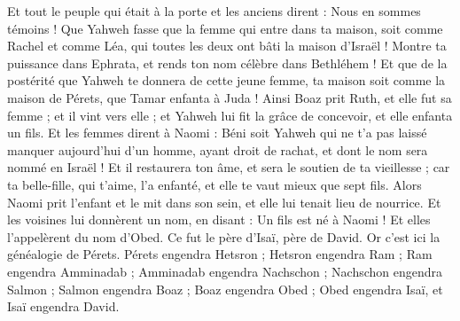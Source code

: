 \begin{multicols}{2}
Et tout le peuple qui était à la porte et les anciens dirent : Nous en sommes témoins ! Que Yahweh fasse que la femme qui entre dans ta maison, soit comme Rachel et comme Léa, qui toutes les deux ont bâti la maison d'Israël ! Montre ta puissance dans Ephrata, et rends ton nom célèbre dans Bethléhem !
Et que de la postérité que Yahweh te donnera de cette jeune femme, ta maison soit comme la maison de Pérets, que Tamar enfanta à Juda !
Ainsi Boaz prit Ruth, et elle fut sa femme ; et il vint vers elle ; et Yahweh lui fit la grâce de concevoir, et elle enfanta un fils.
Et les femmes dirent à Naomi : Béni soit Yahweh qui ne t'a pas laissé manquer aujourd'hui d'un homme, ayant droit de rachat, et dont le nom sera nommé en Israël !
Et il restaurera ton âme, et sera le soutien de ta vieillesse ; car ta belle-fille, qui t'aime, l'a enfanté, et elle te vaut mieux que sept fils.
Alors Naomi prit l'enfant et le mit dans son sein, et elle lui tenait lieu de nourrice.
Et les voisines lui donnèrent un nom, en disant : Un fils est né à Naomi ! Et elles l'appelèrent du nom d'Obed. Ce fut le père d'Isaï, père de David.
Or c'est ici la généalogie de Pérets. Pérets engendra Hetsron ;
Hetsron engendra Ram ; Ram engendra Amminadab ;
Amminadab engendra Nachschon ; Nachschon engendra Salmon ;
Salmon engendra Boaz ; Boaz engendra Obed ;
Obed engendra Isaï, et Isaï engendra David.
\PPE{}
\end{multicols}
